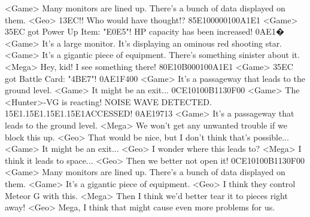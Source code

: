 <Game> Many monitors are lined up. There's a bunch of data displayed on them. 
<Geo> {13}{EC}!! 
Who would have thought!? 
{85}{E1}{00}{00}{01}{00}{A1}{E1} 
<Game> {35}{EC} got Power Up Item: "{E0}{E5}"! 
HP capacity has been increased! 
{0A}{E1}�
<Game> It's a large monitor. 
It's displaying an ominous red shooting star. 
<Game> It's a gigantic piece of equipment. There's something sinister about it. 
<Mega> Hey, kid! I see something there! 
{80}{E1}{0B}{00}{01}{00}{A1}{E1} 
<Game> {35}{EC} got Battle Card: "{4B}{E7}"! 
{0A}{E1}{F4}{00}
<Game> It's a passageway that leads to the ground level. 
<Game> It might be an exit... 
{0C}{E1}{01}{00}{B1}{13}{0F}{00}
<Game> The <Hunter>-VG is reacting! 
NOISE WAVE DETECTED. {15}{E1}.{15}{E1}.{15}{E1}.{15}{E1}ACCESSED! 
{0A}{E1}{97}{13}
<Game> It's a passageway that leads to the ground level. 
<Mega> We won't get any unwanted trouble if we block this up. 
<Geo> That would be nice, but I don't think that's possible... 
<Game> It might be an exit... 
<Geo> I wonder where this leads to? 
<Mega> I think it leads to space... 
<Geo> Then we better not open it! 
{0C}{E1}{01}{00}{B1}{13}{0F}{00}
<Game> Many monitors are lined up. There's a bunch of data displayed on them. 
<Game> It's a gigantic piece of equipment. 
<Geo> I think they control Meteor G with this. 
<Mega> Then I think we'd better tear it to pieces right away! 
<Geo> Mega, I think that might cause even more problems for us. 
